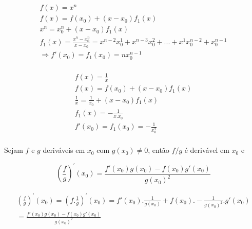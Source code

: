 \documentclass[11pt, oneside, a4paper]{gsm-l}
\begin{document}
\begin{exem}

\[
\begin{array}{l}
f\left( x \right) = x^n \\
f\left( x \right) = f\left( {x_0 } \right) + \left( {x - x_0 } \right)f_1
\left( x \right) \\
x^n = x_0^n + \left( {x - x_0 } \right)f_1 \left( x \right) \\
f_1 \left( x \right) = \frac{x^n - x_0^n }{x - x_0 } = x^{n - 2}x_0^1 +
x^{n - 3}x_0^2 + ... + x^1x_0^{n - 2} + x_0^{n - 1} \\
\Rightarrow f'\left( {x_0 } \right) = f_1 \left( {x_0 } \right) = nx_0^{n -
1} \\
\end{array}
\]

\end{exem}

\begin{exem}

\[
\begin{array}{l}
f\left( x \right) = \frac{1}{x} \\
f\left( x \right) = f\left( {x_0 } \right) + \left( {x - x_0 } \right)f_1
\left( x \right) \\
\frac{1}{x} = \frac{1}{x_0 } + \left( {x - x_0 } \right)f_1 \left( x
\right) \\
f_1 \left( x \right) = - \frac{1}{x.x_0 } \\
f'\left( {x_0 } \right) = f_1 \left( {x_0 } \right) = - \frac{1}{x_0^2 } \\
\end{array}
\]

\end{exem}

\begin{teo}

Sejam $f$ e $g$ deriváveis em $x_0 $ com $g\left( {x_0 } \right) \ne 0$,
então $f / g$ é derivável em $x_0 $ e

\[
\left( {\frac{f}{g}} \right)^{'}\left( {x_0 } \right) = \frac{f'\left( {x_0 }
\right)g\left( {x_0 } \right) - f\left( {x_0 } \right)g'\left( {x_0 }
\right)}{g\left( {x_0 } \right)^2}
\]

\end{teo}

\begin{dem}

\[
\begin{array}{l}
\left( {\frac{f}{g}} \right)^{'}\left( {x_0 } \right) = \left(
{f.\frac{1}{g}} \right)^{'}\left( {x_0 } \right) = f'\left( {x_0 }
\right).\frac{1}{g\left( {x_0 } \right)} + f\left( {x_0 } \right). -
\frac{1}{g\left( {x_0 } \right)^2}.g'\left( {x_0 } \right) \\
 = \displaystyle\frac{f'\left( {x_0 } \right)g\left( {x_0 } \right) - f\left( {x_0 }
\right)g'\left( {x_0 } \right)}{g\left( {x_0 } \right)^2} \\
\end{array}
\]

\end{dem}
\end{document}
